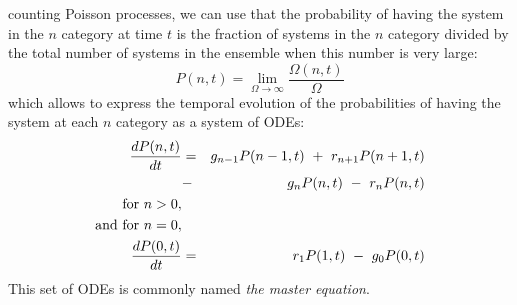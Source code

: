 counting Poisson processes, we can use that the probability of having the system in the $n$ category at time $t$ is the fraction of systems in the $n$ category divided by the total number of systems in the ensemble when this number is very large:
\begin{equation}
P(n, t) = \lim_{\Omega \rightarrow \infty} \frac{\Omega(n,t)}{\Omega} 
\end{equation}
which allows to express the temporal evolution of the probabilities of having the system at each $n$ category as a system of ODEs:
\begin{eqnarray}
\frac{dP(n,t)}{dt}            & = & g_{n-1} P(n-1,t) \,\, + \,\, r_{n+1} P(n+1,t) \nonumber \\
                              & - & g_n P(n,t) \,\, - \,\, r_n  P(n,t)            \nonumber \\
\textup{for} \,\, n > 0,      &   &                                               \nonumber \\        
\textup{and for} \,\, n = 0,  &   &                                               \nonumber \\
\frac{dP(0,t)}{dt}            & = & r_1 P(1,t) \,\, - \,\, g_0 P(0,t)             
\label{me_1}
\end{eqnarray}
This set of ODEs is commonly named {\em the master equation}.

